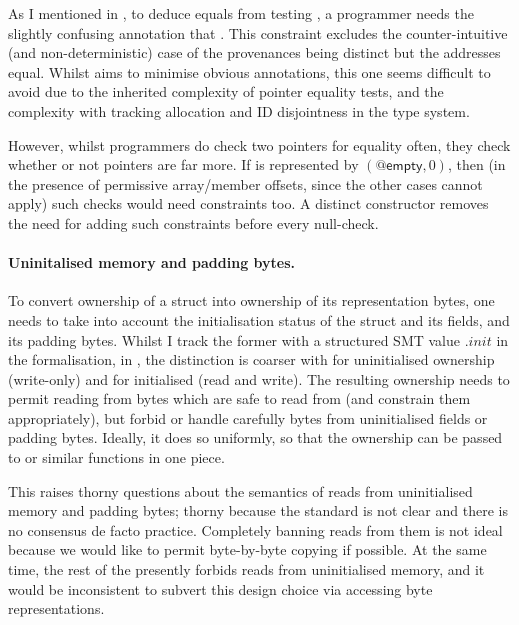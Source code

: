 As I mentioned in , to deduce  equals
 from testing , a programmer needs the slightly
confusing annotation that . %
This constraint excludes the counter-intuitive (and non-deterministic) case of
the provenances being distinct but the addresses equal. Whilst  aims to minimise
obvious annotations, this one seems difficult to avoid due to the
inherited complexity of pointer equality tests, and the complexity with
tracking allocation and ID disjointness in the type system.

However, whilst programmers do check two pointers for equality often, they
check whether or not pointers are  far more. If  is
represented by $(@\mathsf{empty}, 0)$, then (in the presence of permissive
array/member offsets, since the other cases cannot apply) such checks would
need constraints too. A distinct  constructor removes the need
for adding such constraints before every null-check.

\paragraph{Uninitalised memory and padding bytes.}%
To convert ownership of a struct into ownership of its representation bytes,
one needs to take into account the initialisation status of the struct and its
fields, and its padding bytes. Whilst I track the former with a structured SMT
value $.\mathit{init}$ in the formalisation, in , the distinction is
coarser with  for uninitialised ownership (write-only) and
 for initialised (read and write). The resulting ownership
needs to permit reading from bytes which are safe to read from (and constrain
them appropriately), but forbid or handle carefully bytes from uninitialised
fields or padding bytes. Ideally, it does so uniformly, so that the ownership
can be passed to  or similar functions in one piece.

This raises thorny questions about the semantics of reads from uninitialised
memory and padding bytes; thorny because the  standard is not clear and
there is no consensus de facto practice. Completely banning reads from them is
not ideal because we would like to permit byte-by-byte copying if possible. At
the same time, the rest of the  presently forbids reads from
uninitialised memory, and it
would be inconsistent to subvert this design choice via accessing byte
representations.


